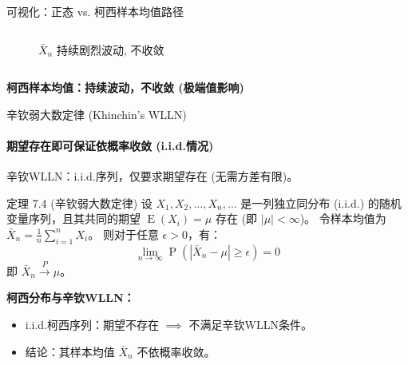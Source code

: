 \documentclass[UTF8]{beamer}
\DeclareMathOperator{\E}{\operatorname{E}}
\DeclareMathOperator{\Prob}{\operatorname{P}}
\begin{document}
\begin{frame}[shrink=10]{可视化：正态 vs. 柯西样本均值路径}
\begin{columns}[T]
\begin{column}{0.5\textwidth}
\begin{figure}
                \caption{$\bar{X}_n$ 持续剧烈波动, \alert{不收敛}}
            \end{figure}
        \end{column}
    \end{columns}
    \vspace{0.2cm}
    \centering
    \textbf{柯西样本均值：持续波动，不收敛 (极端值影响)}
\end{frame}

\begin{frame}[shrink=10]{辛钦弱大数定律 (Khinchin's WLLN)}
    \framesubtitle{期望存在即可保证依概率收敛 (i.i.d.情况)}
    辛钦WLLN：i.i.d.序列，仅要求\alert{期望存在} (无需方差有限)。
    \vspace{0.3cm}
    \begin{block}{定理 7.4 (辛钦弱大数定律)} %
        设 $X_1, X_2, \dots, X_n, \dots$ 是一列\alert{独立同分布 (i.i.d.)} 的随机变量序列，且其共同的期望 $\E(X_i) = \mu$ \alert{存在} (即 $|\mu| < \infty$)。
        令样本均值为 $\bar{X}_n = \frac{1}{n} \sum_{i=1}^{n} X_i$。
        则对于任意 $\epsilon > 0$，有：
        \[ \lim_{n \to \infty} \Prob(|\bar{X}_n - \mu| \geq \epsilon) = 0 \]
        即 $\bar{X}_n \xrightarrow{P} \mu$。
    \end{block}
    \vspace{0.3cm}
    \textbf{柯西分布与辛钦WLLN：}
    \begin{itemize}
        \item i.i.d.柯西序列：期望\alert{不存在} $\implies$ \alert{不满足}辛钦WLLN条件。
        \item 结论：其样本均值 $\bar{X}_n$ \alert{不}依概率收敛。
    \end{itemize}
\end{frame}
\end{document}
